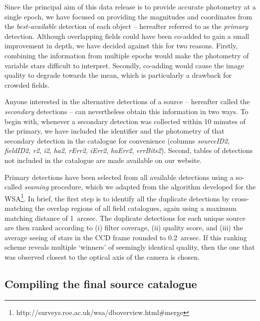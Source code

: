 \documentclass[a4paper,useAMS,usenatbib]{mn2e}
\begin{document}
Since the principal aim of this data release is to provide 
accurate photometry at a single epoch,
we have focused on providing the magnitudes
and coordinates from the \emph{best-available} 
detection of each object -- 
hereafter referred to as the \emph{primary} detection.
Although overlapping fields could have been co-added 
to gain a small improvement in depth, 
we have decided against this for two reasons.
Firstly, combining the information from multiple epochs
would make the photometry of variable stars difficult to interpret.
Secondly, co-adding would cause the image quality to degrade towards the mean,
which is particularly a drawback for crowded fields.

Anyone interested in the alternative detections of a source
-- hereafter called the \emph{secondary} detections --
can nevertheless obtain this information in two ways.
To begin with, whenever a secondary detection was collected 
within 10 minutes of the primary,
we have included the identifier and the photometry
of that secondary detection
in the catalogue for convenience
(columns \emph{sourceID2}, \emph{fieldID2}, 
\emph{r2}, \emph{i2}, \emph{ha2},
\emph{rErr2}, \emph{iErr2}, \emph{haErr2}, \emph{errBits2}).
Second, tables of detections not included in the catalogue
are made available on our website.

Primary detections have been selected from all available detections using a so-called \emph{seaming} procedure,
which we adapted from the algorithm developed for the WSA\footnote{http://surveys.roe.ac.uk/wsa/dboverview.html\#merge}.
In brief, the first step is to identify all the duplicate detections
by cross-matching the overlap regions of all field catalogues,
again using a maximum matching distance of 1~arcsec.
The duplicate detections for each unique source are then ranked according to
(i) filter coverage, (ii) quality score,
and (iii) the average seeing of stars in the CCD frame rounded to 0.2~arcsec.
If this ranking scheme reveals multiple `winners' of seemingly identical quality,
then the one that was observed closest to the optical axis of the camera is chosen.


\subsection{Compiling the final source catalogue}
\end{document}
